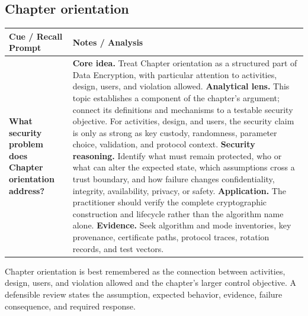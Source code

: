 \documentclass[11pt]{article}
\newcommand{\CornellHeader}{%
\rowcolor{Navy}\color{white}\bfseries Cue / Recall Prompt & \color{white}\bfseries Notes / Analysis\\\hline}
\newcommand{\CornellRow}[2]{%
\cellcolor{CueGray}\RaggedRight\textbf{#1} & \RaggedRight #2\\\hline}
\begin{document}
\subsection*{Chapter orientation}
\begin{longtable}{>{\RaggedRight\arraybackslash}p{}|>{\RaggedRight\arraybackslash}p{}}
\CornellHeader
\CornellRow{What security problem does Chapter orientation address?}{\textbf{Core idea.} Treat Chapter orientation as a structured part of Data Encryption, with particular attention to activities, design, users, and violation allowed. \textbf{Analytical lens.} This topic establishes a component of the chapter's argument; connect its definitions and mechanisms to a testable security objective. For activities, design, and users, the security claim is only as strong as key custody, randomness, parameter choice, validation, and protocol context. \textbf{Security reasoning.} Identify what must remain protected, who or what can alter the expected state, which assumptions cross a trust boundary, and how failure changes confidentiality, integrity, availability, privacy, or safety. \textbf{Application.} The practitioner should verify the complete cryptographic construction and lifecycle rather than the algorithm name alone. \textbf{Evidence.} Seek algorithm and mode inventories, key provenance, certificate paths, protocol traces, rotation records, and test vectors.}
\end{longtable}
\begin{topicsummary}
Chapter orientation is best remembered as the connection between activities, design, users, and violation allowed and the chapter's larger control objective. A defensible review states the assumption, expected behavior, evidence, failure consequence, and required response.
\end{topicsummary}
\end{document}
